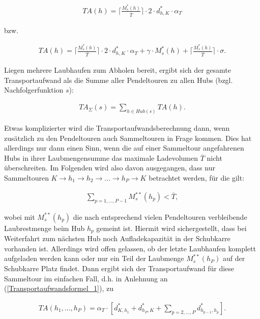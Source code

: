 \documentclass[fontsize=12pt,doubleside,openany,listof=totoc,listof=flat,listof=nochaptergap,numbers=noenddot]{scrbook}
\theoremstyle{style}
\begin{document}
\begin{align}
TA(h) = \Big\lceil \frac{M^*_s(h)}{\overline{T}} \Big\rceil \cdot 2 \cdot d^*_{h,K} \cdot \alpha_T
\label{Transportaufwandsformel_3}
\end{align}

\noindent bzw. 

\begin{align}
TA(h) = \Big\lceil \frac{M^*_s(h)}{\overline{T}} \Big\rceil  \cdot 2 \cdot d^*_{h,K} \cdot \alpha_T +
\gamma \cdot M^*_s(h) + \Big\lceil \frac{M^*_s(h)}{\overline{T}} \Big\rceil \cdot \sigma.\label{Transportaufwandsformel_4}
\end{align}

\noindent Liegen mehrere Laubhaufen zum Abholen bereit, ergibt sich der gesamte 
Transportaufwand als die Summe aller Pendeltouren zu allen Hubs (bzgl. Nachfolgerfunktion $s$):

\begin{align}
TA_\Sigma(s) = \sum_{h \in Hub(s)} TA(h).
\label{Transportaufwandsformel_5}
\end{align}

\noindent Etwas komplizierter wird die Transportaufwandsberechnung dann, wenn 
zusätzlich zu den Pendeltouren auch Sammeltouren in Frage kommen. 
Dies hat allerdings nur dann einen Sinn, wenn die auf einer Sammeltour 
angefahrenen Hubs in ihrer Laubmengensumme das maximale
Ladevolumen $\overline{T}$ nicht überschreiten. Im Folgenden wird also davon
ausgegangen, dass nur Sammeltouren $K \rightarrow h_1 \rightarrow h_2
\rightarrow \ldots \rightarrow h_P \rightarrow K$ betrachtet werden, 
für die gilt:

\begin{align}
\sum_{p=1,\ldots,P-1}{M^{**}_s(h_p)}< \overline{T},
\label{Sammeltourbedingung}
\end{align}

\noindent wobei mit $M^{**}_s(h_p)$ die nach entsprechend vielen Pendeltouren verbleibende Laubrestmenge\label{Laubrestmenge} beim Hub $h_p$ gemeint ist. Hiermit wird sichergestellt, dass bei Weiterfahrt zum nächsten Hub noch Aufladekapazität in der Schubkarre vorhanden ist. Allerdings wird 
offen gelassen, ob der letzte Laubhaufen komplett aufgeladen werden kann 
oder nur ein Teil der Laubmenge $M^{**}_s(h_P)$ auf der Schubkarre Platz findet. 
Dann ergibt sich der Transportaufwand für diese Sammeltour im einfachen 
Fall, d.h. in Anlehnung an (\ref{Transportaufwandsformel_1}), zu

\begin{align}
TA(h_1,\ldots,h_P)=\alpha_T \cdot 
[d^*_{K,h_1} + d^*_{h_P,K}+\sum_{p=2,\dots,P} d^*_{h_{p-1},h_p}].
\label{Sammeltourformel}
\end{align}
\end{document}
